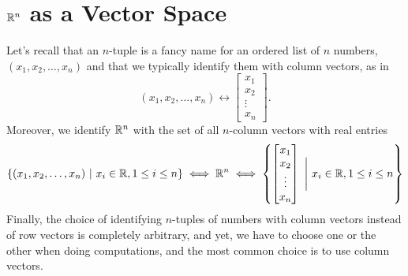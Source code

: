 \section{$\mathbb R^n$ as a Vector Space}
\label{sec:VectorSpace}

Let's recall that an $n$-tuple is a fancy name for an ordered list of $n$ numbers, $(x_1, x_2, \ldots, x_n)$ and that we typically identify them with column vectors, as in 
$$(x_1, x_2, \ldots, x_n) \longleftrightarrow \begin{bmatrix} x_1 \\ x_2 \\ \vdots \\ x_n\end{bmatrix}. $$
Moreover, we identify $\mathbb R^n$ with the set of all $n$-column vectors with real entries
$$
\{(x_1, x_2, \ldots, x_n)~|~x_i \in \mathbb R, 1\le i \le n \} \iff \mathbb R^n \iff  \left\{\begin{bmatrix} x_1 \\ x_2 \\ \vdots \\ x_n\end{bmatrix} ~\Bigg|~  x_i \in \mathbb R, 1\le i \le n \right\}
$$
Finally, the choice of identifying $n$-tuples of numbers with column vectors instead of row vectors is completely arbitrary, and yet, we have to choose one or the other when doing computations, and the most common choice is to use column vectors.

